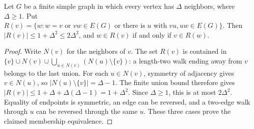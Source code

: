 \begin{lemma}
Let $G$ be a finite simple graph in which every vertex has $\Delta$
neighbors, where $\Delta\ge1$. Put
$R(v)=\{w:w=v\text{ or }vw\in E(G)\text{ or there is }u
\text{ with }vu,uw\in E(G)\}$.
Then $|R(v)|\le1+\Delta^2\le2\Delta^2$, and
$w\in R(v)$ if and only if $v\in R(w)$.
\end{lemma}
\begin{proof}
Write $N(v)$ for the neighbors of $v$. The set $R(v)$ is contained in
$\{v\}\cup N(v)\cup\bigcup_{u\in N(v)}(N(u)\setminus\{v\})$:
a length-two walk ending away from $v$ belongs to the last union.
For each $u\in N(v)$, symmetry of adjacency gives $v\in N(u)$, so
$|N(u)\setminus\{v\}|=\Delta-1$. The finite union bound therefore gives
$|R(v)|\le1+\Delta+\Delta(\Delta-1)=1+\Delta^2$.
Since $\Delta\ge1$, this is at most $2\Delta^2$.
Equality of endpoints is symmetric, an edge can be reversed, and a
two-edge walk through $u$ can be reversed through the same $u$.
These three cases prove the claimed membership equivalence.
\end{proof}
